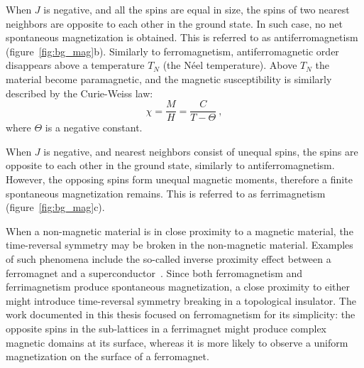 When $J$ is negative, and all the spins are equal in size, the spins of two nearest neighbors are opposite to each other in the ground state. In such case, no net spontaneous magnetization is obtained. This is referred to as antiferromagnetism (figure~\ref{fig:bg_mag}b). Similarly to ferromagnetism, antiferromagnetic order disappears above a temperature $T_N$ (the N\'eel temperature). Above $T_N$ the material become paramagnetic, and the magnetic susceptibility is similarly described by the Curie-Weiss law:%
\begin{equation}%
    \chi = \frac{M}{H} = \frac{C}{T - \Theta}~,%
\end{equation}%
where $\Theta$ is a negative constant.

When $J$ is negative, and nearest neighbors consist of unequal spins, the spins are opposite to each other in the ground state, similarly to antiferromagnetism. However, the opposing spins form unequal magnetic moments, therefore a finite spontaneous magnetization remains. This is referred to as ferrimagnetism (figure~\ref{fig:bg_mag}c).

When a non-magnetic material is in close proximity to a magnetic material, the time-reversal symmetry may be broken in the non-magnetic material. Examples of such phenomena include the so-called inverse proximity effect between a ferromagnet and a superconductor~\cite{Xia2009, Kalcheim2015}. Since both ferromagnetism and ferrimagnetism produce spontaneous magnetization, a close proximity to either might introduce time-reversal symmetry breaking in a topological insulator. The work documented in this thesis focused on ferromagnetism for its simplicity: the opposite spins in the sub-lattices in a ferrimagnet might produce complex magnetic domains at its surface, whereas it is more likely to observe a uniform magnetization on the surface of a ferromagnet.